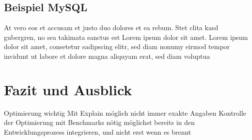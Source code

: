 \section{Beispiel MySQL}
 At vero eos et
  accusam et justo duo dolores et ea rebum. Stet clita kasd
  gubergren, no sea takimata sanctus est Lorem ipsum dolor sit
  amet. Lorem ipsum dolor sit amet, consetetur sadipscing elitr,
  sed diam nonumy eirmod tempor invidunt ut labore et dolore
  magna aliquyam erat, sed diam voluptua

\chapter{Fazit und Ausblick}

Optimierung wichtig
Mit Explain möglich
nicht immer exakte Angaben
Kontrolle der Optimierung mit Benchmarks nötig
möglichst bereits in den Entwicklungsprozess integrieren, und nicht erst wenn es brennt
